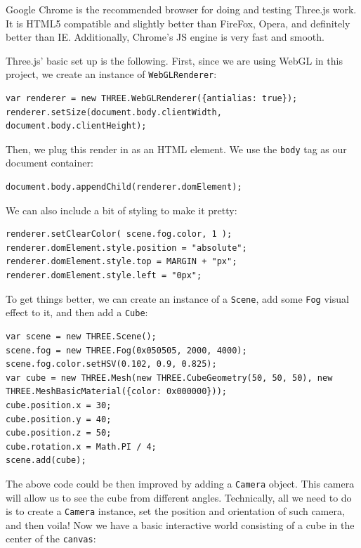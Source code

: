 Google Chrome is the recommended browser for doing and testing Three.js work. It is HTML5 compatible and slightly better than FireFox, Opera, and definitely better than IE. Additionally, Chrome's JS engine is very fast and smooth.


Three.js' basic set up is the following. First, since we are using WebGL in this project, we create an instance of \texttt{WebGLRenderer}:

\begin{lstlisting}
var renderer = new THREE.WebGLRenderer({antialias: true});
renderer.setSize(document.body.clientWidth, document.body.clientHeight);
\end{lstlisting}

Then, we plug this render in as an HTML element. We use the \texttt{body} tag as our document container:

\begin{lstlisting}
document.body.appendChild(renderer.domElement);
\end{lstlisting}

We can also include a bit of styling to make it pretty:

\begin{lstlisting}
renderer.setClearColor( scene.fog.color, 1 );
renderer.domElement.style.position = "absolute";
renderer.domElement.style.top = MARGIN + "px";
renderer.domElement.style.left = "0px";
\end{lstlisting}

To get things better, we can create an instance of a \texttt{Scene}, add some \texttt{Fog} visual effect to it, and then add a \texttt{Cube}: 

\begin{lstlisting}
var scene = new THREE.Scene();
scene.fog = new THREE.Fog(0x050505, 2000, 4000);
scene.fog.color.setHSV(0.102, 0.9, 0.825);
var cube = new THREE.Mesh(new THREE.CubeGeometry(50, 50, 50), new THREE.MeshBasicMaterial({color: 0x000000}));
cube.position.x = 30;
cube.position.y = 40;
cube.position.z = 50;
cube.rotation.x = Math.PI / 4;
scene.add(cube);
\end{lstlisting}

The above code could be then improved by adding a \texttt{Camera} object. This camera will allow us to see the cube from different angles. Technically, all we need to do is to create a \texttt{Camera} instance, set the position and orientation of such camera, and then voila! Now we have a basic interactive world consisting of a cube in the center of the \texttt{canvas}:

